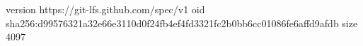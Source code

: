 version https://git-lfs.github.com/spec/v1
oid sha256:d99576321a32e66e3110d0f24fb4ef4fd3321fc2b0bb6cc01086fe6affd9afdb
size 4097
